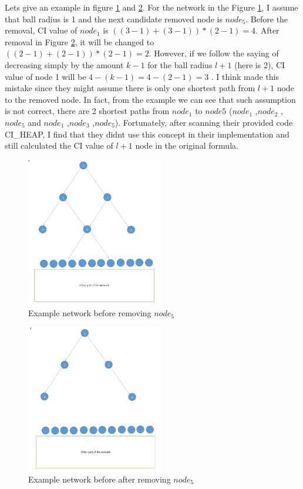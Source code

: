 \documentclass{article}
\begin{document}
	

	Let\textquotesingle s give an example in figure \ref{fig:figure1} and \ref{fig:figure2}. For the network in the Figure \ref{fig:figure1}, I assume that ball radius is 1 and the next candidate removed node is $node_5$. Before the removal, CI value of $node_1$ is $((3-1)+(3-1))*(2-1)=4$. After removal in Figure \ref{fig:figure2}, it will be changed to $((2-1)+(2-1))*(2-1)=2$. However, if we follow the saying of decreasing simply by the amount $k − 1$ for the ball radius $l + 1$ (here is 2), CI value of node 1 will be $4-(k-1)=4-(2-1)=3$ . I think \cite{morone2016collective} made this mistake since they might assume there is only one shortest path from $l + 1$ node to the removed node. In fact, from the example we can see that such assumption is not correct, there are 2 shortest paths from $node_1$ to $node 5$ ($node_1$ ,$node_2$ ,$node_5$ and $node_1$ ,$node_3$ ,$node_5$). Fortunately, after scanning their provided code CI\_HEAP, I find that they didn\textquotesingle t use this concept in their implementation and still calculated the CI value of $l + 1$ node in the original formula.
	
	\begin{figure}[htp]
	\centering 
	\includegraphics[width = 6cm]{1.png}
	\caption{Example network before removing $node_5$  }
	\label{fig:figure1}
	\end{figure}
	
	\begin{figure}[htp]
	\centering 
	\includegraphics[width = 6cm]{2.png}
	\caption{Example network before after removing $node_5$  }
	\label{fig:figure2}
	\end{figure}	
	
\end{document}
